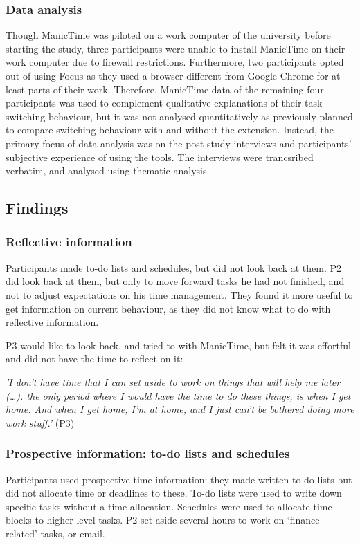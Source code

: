 \subsubsection{Data analysis}
Though ManicTime was piloted on a work computer of the university before starting the study, three participants were unable to install ManicTime on their work computer due to firewall restrictions. Furthermore, two participants opted out of using Focus as they used a browser different from Google Chrome for at least parts of their work. Therefore, ManicTime data of the remaining four participants was used to complement qualitative explanations of their task switching behaviour, but it was not analysed quantitatively as previously planned to compare switching behaviour with and without the extension. Instead, the primary focus of data analysis was on the post-study interviews and participants' subjective experience of using the tools. The interviews were trancsribed verbatim, and analysed using thematic analysis.


\subsection{Findings}
\subsubsection{Reflective information}
Participants made to-do lists and schedules, but did not look back at them. P2 did look back at them, but only to move forward tasks he had not finished, and not to adjust expectations on his time management. They found it more useful to get information on current behaviour, as they did not know what to do with reflective information. 

P3 would like to look back, and tried to with ManicTime, but felt it was effortful and did not have the time to reflect on it:

\textit{'I don't have time that I can set aside to work on things that will help me later (…). the only period where I would have the time to do these things, is when I get home. And when I get home, I'm at home, and I just can't be bothered doing more work stuff.'} (P3)

\subsubsection{Prospective information: to-do lists and schedules}
Participants used prospective time information: they made written to-do lists but did not allocate time or deadlines to these. To-do lists were used to write down specific tasks without a time allocation. Schedules were used to allocate time blocks to higher-level tasks. P2 set aside several hours to work on `finance-related' tasks, or email.

